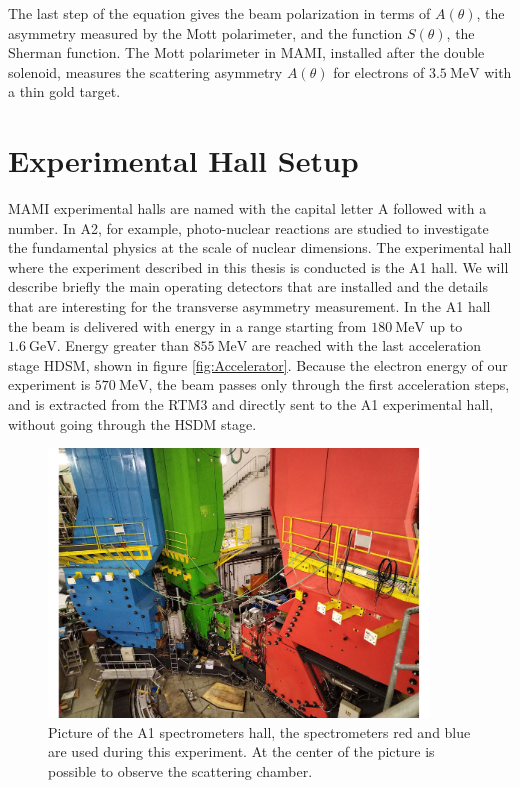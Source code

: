 The last step of the equation gives the beam polarization in terms of $A(\theta)$, the asymmetry measured by the Mott polarimeter, and the function $S(\theta)$, the Sherman function. The Mott polarimeter in MAMI, installed after the double solenoid, measures the scattering asymmetry $A(\theta)$ for electrons of $\SI{3.5}{\mega \electronvolt}$ with a thin gold target.  

\section{Experimental Hall Setup} \label{ExperimentalHall}

MAMI experimental halls are named with the capital letter A followed with a number. In A2, for example, photo-nuclear reactions are studied to investigate the fundamental physics at the scale of nuclear dimensions. The experimental hall where the experiment described in this thesis is conducted is the A1 hall. We will describe briefly the main operating detectors that are installed and the details that are interesting for the transverse asymmetry measurement.
In the A1 hall the beam is delivered with energy in a range starting from $\SI{180}{\mega \electronvolt}$ up to $\SI{1.6}{\giga \electronvolt}$. Energy greater than $\SI{855}{\mega \electronvolt}$ are reached with the last acceleration stage HDSM, shown in figure \ref{fig:Accelerator}. Because the electron energy of our experiment is $\SI{570}{\mega \electronvolt}$, the beam passes only through the first acceleration steps, and is extracted from the RTM3 and directly sent to the A1 experimental hall, without going through the HSDM stage. 

\begin{figure}[!ht]
\centering
\includegraphics[width = 0.9\textwidth]{figures/twoSpektrometer.pdf}
\caption{Picture of the A1 spectrometers hall, the spectrometers red and blue are used during this experiment. At the center of the picture is possible to observe the scattering chamber.}
\label{fig:TwoSpektr}
\end{figure}

